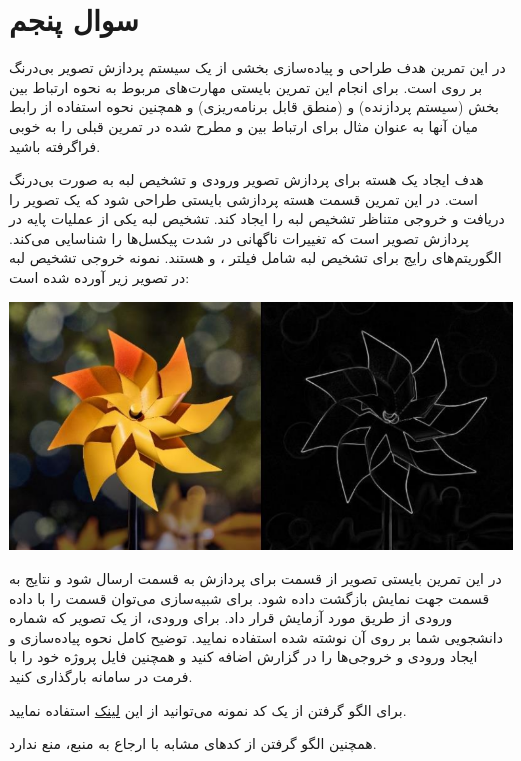 \section{سوال پنجم}

در این تمرین هدف طراحی و پیاده‌سازی بخشی از یک سیستم پردازش تصویر بی‌درنگ بر روی  است. برای انجام این تمرین بایستی مهارت‌های مربوط به نحوه ارتباط بین بخش  (سیستم پردازنده) و  (منطق قابل برنامه‌ریزی) و همچنین نحوه استفاده از رابط میان آنها به عنوان مثال  برای ارتباط بین  و  مطرح شده در تمرین قبلی را به خوبی فراگرفته باشید.

هدف ایجاد یک هسته برای پردازش تصویر ورودی و تشخیص لبه به صورت بی‌درنگ است. در این تمرین قسمت هسته پردازشی بایستی طراحی شود که یک تصویر را دریافت و خروجی متناظر تشخیص لبه را ایجاد کند. تشخیص لبه یکی از عملیات پایه در پردازش تصویر است که تغییرات ناگهانی در شدت پیکسل‌ها را شناسایی می‌کند. الگوریتم‌های رایج برای تشخیص لبه شامل فیلتر ،  و  هستند. نمونه خروجی تشخیص لبه در تصویر زیر آورده شده است:

\begin{center}
	\includegraphics*[width=0.8\linewidth]{pics/img1.png}
	\label{تشخیص لبه در تصویر}
\end{center}


در این تمرین بایستی تصویر از قسمت  برای پردازش به قسمت  ارسال شود و نتایج به قسمت  جهت نمایش بازگشت داده شود. برای شبیه‌سازی می‌توان قسمت  را با داده ورودی از طریق  مورد آزمایش قرار داد. برای ورودی، از یک تصویر که شماره دانشجویی شما بر روی آن نوشته شده استفاده نمایید. توضیح کامل نحوه پیاده‌سازی و ایجاد ورودی و خروجی‌ها را در گزارش اضافه کنید و همچنین فایل پروژه خود را با فرمت  در سامانه بارگذاری کنید.

برای الگو گرفتن از یک کد نمونه می‌توانید از این
\href{https://github.com/JeffreySamuel/canny_edge_detection_in_FPGA/tree/main}{لینک}
 استفاده نمایید.
 
 همچنین الگو گرفتن از کدهای مشابه با ارجاع به منبع، منع ندارد.

